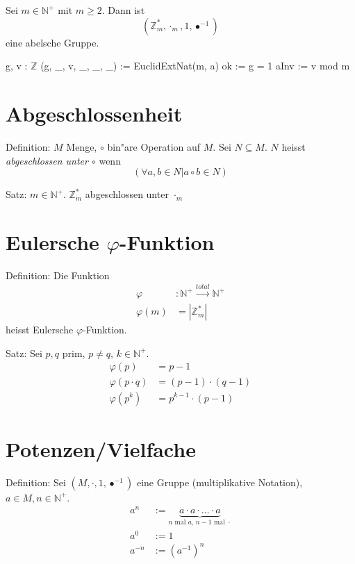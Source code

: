 \documentclass[a4paper, ngerman, landscape, fleqn]{article}
\begin{document}
\begin{multicols*}{3}
Sei $m \in \mathbb{N}^+$ mit $m \geq 2$. Dann ist
\begin{equation*}
    (\mathbb{Z}^*_m, \cdot_m, 1, \bullet^{-1}) 
\end{equation*}
eine abelsche Gruppe.

\begin{algorithmic}
        \State {}
        \State {}
        \State {}
        \State g, v : $\mathbb{Z}$
        \State (g, \_, v, \_, \_, \_) := EuclidExtNat(m, a)
        \State {}
        \State ok := g = 1
        \State {}
            \State aInv := v mod m
        \EndIf
    \EndFunction
\end{algorithmic}

\section*{Abgeschlossenheit}
Definition: $M$ Menge, $\circ$ bin"are Operation auf $M$. Sei $N \subseteq M$.
$N$ heisst \emph{abgeschlossen unter $\circ$} wenn
\begin{equation*}
    (\forall a, b \in N | a \circ b \in N)
\end{equation*}

Satz: $m \in \mathbb{N}^+$. $\mathbb{Z}^*_m$ abgeschlossen unter $\cdot_m$

\section*{Eulersche $\varphi$-Funktion}
Definition:  Die Funktion
\begin{align*}
    \varphi &: \mathbb{N}^+ \xrightarrow{total} \mathbb{N}^+ \\
    \varphi(m) &= | \mathbb{Z}^*_m|
\end{align*}
heisst Eulersche $\varphi$-Funktion.

Satz: Sei $p, q$ prim, $p \neq q$, $k \in \mathbb{N}^+$.
\begin{align*}
    \varphi(p) &= p - 1 \\
    \varphi(p \cdot q) &= (p - 1) \cdot (q - 1) \\
    \varphi(p^k) &= p^{k - 1} \cdot (p - 1)
\end{align*}

\section*{Potenzen/Vielfache}
Definition: Sei $(M, \cdot, 1, \bullet^{-1})$ eine Gruppe (multiplikative Notation), $a \in M, n \in \mathbb{N}^+$.
\begin{align*}
    a^n &:= \underbrace{a \cdot a \cdot \dotsc \cdot a}_{\text{$n$ mal $a$, $n - 1$ mal $\cdot$}} \\
    a^0 &:= 1 \\
    a^{-n} &:= \left(a^{-1}\right)^n
\end{align*}


\end{multicols*}
\end{document}
